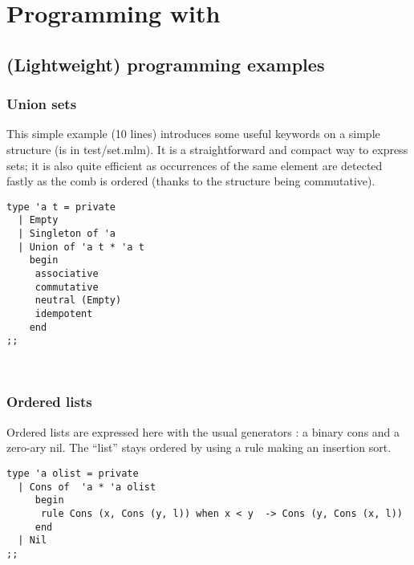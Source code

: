 \chapter{Programming with \moca}
\label{chap:examples}

\section{(Lightweight) programming examples}

\label{sec:lipex}

\subsection{Union sets}

This simple example (10 lines) introduces some useful keywords on a simple
structure (is in {\sf test/set.mlm}). It is a straightforward and
compact way to express sets; it is also quite efficient as occurrences
of the same element are detected fastly as the comb is ordered (thanks
to the structure being commutative).

\begin{lstlisting}[caption={Sets in \moca}, captionpos=b]
type 'a t = private
  | Empty
  | Singleton of 'a
  | Union of 'a t * 'a t
    begin
     associative
     commutative
     neutral (Empty)
     idempotent
    end
;;
\end{lstlisting}

 \\

\subsection{Ordered lists}
\label{sec:olist}

Ordered lists are expressed here with the usual generators : a binary
cons and a zero-ary nil. The ``list'' stays ordered by using a \moca
rule making an insertion sort.

\begin{lstlisting}[caption={Ordered lists}]
  type 'a olist = private
  | Cons of  'a * 'a olist
     begin
      rule Cons (x, Cons (y, l)) when x < y  -> Cons (y, Cons (x, l))
     end
  | Nil
;;
\end{lstlisting}

